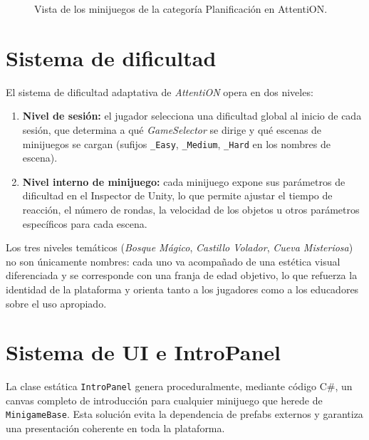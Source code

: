 \documentclass[12pt, a4paper]{report}
\begin{document}
\begin{figure}[H]
  \centering
  \caption{Vista de los minijuegos de la categoría Planificación en AttentiON.}
  \label{fig:planificacion}
\end{figure}

\section{Sistema de dificultad}

El sistema de dificultad adaptativa de \textit{AttentiON} opera en dos niveles:

\begin{enumerate}
  \item \textbf{Nivel de sesión:} el jugador selecciona una dificultad global
    al inicio de cada sesión, que determina a qué \textit{GameSelector} se
    dirige y qué escenas de minijuegos se cargan (sufijos \texttt{\_Easy},
    \texttt{\_Medium}, \texttt{\_Hard} en los nombres de escena).
  \item \textbf{Nivel interno de minijuego:} cada minijuego expone sus
    parámetros de dificultad en el Inspector de Unity, lo que permite ajustar
    el tiempo de reacción, el número de rondas, la velocidad de los objetos u
    otros parámetros específicos para cada escena.
\end{enumerate}

Los tres niveles temáticos (\textit{Bosque Mágico}, \textit{Castillo Volador},
\textit{Cueva Misteriosa}) no son únicamente nombres: cada uno va acompañado
de una estética visual diferenciada y se corresponde con una franja de edad
objetivo, lo que refuerza la identidad de la plataforma y orienta tanto a los
jugadores como a los educadores sobre el uso apropiado.

\section{Sistema de UI e IntroPanel}

La clase estática \texttt{IntroPanel} genera proceduralmente, mediante código C\#,
un canvas completo de introducción para cualquier minijuego que herede de
\texttt{MinigameBase}. Esta solución evita la dependencia de prefabs externos y
garantiza una presentación coherente en toda la plataforma.
\end{document}

